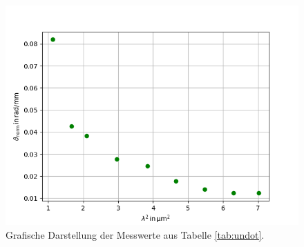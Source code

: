 \begin{figure}
  \centering
  \includegraphics[scale=0.7]{fig/undotiert.png}
  \caption{Grafische Darstellung der Messwerte aus Tabelle \ref{tab:undot}.}
  \label{abb:undot}
\end{figure}
\FloatBarrier

